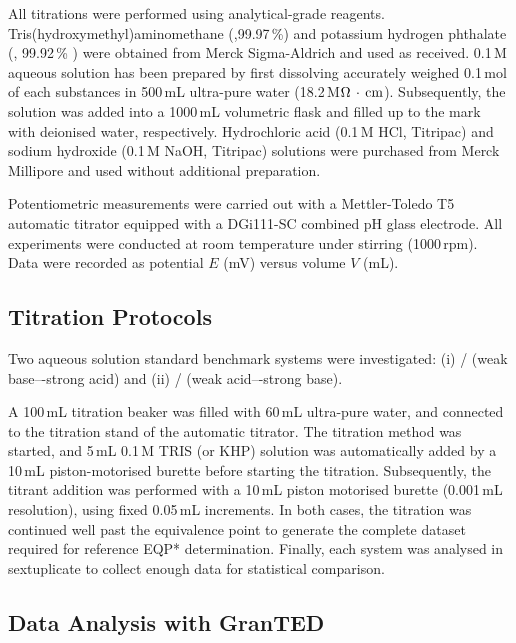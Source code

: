\documentclass[twoside,twocolumn,9pt]{article}
\begin{document}
All titrations were performed using analytical-grade reagents.
Tris(hydroxymethyl)aminomethane (,99.97\,\%) and potassium hydrogen phthalate (, 99.92\,\% ) were obtained from Merck Sigma-Aldrich and used as received.
0.1\,M aqueous solution has been prepared by first dissolving accurately weighed 0.1\,mol of each substances in 500\,mL ultra-pure water (18.2\,M$\Omega\,\cdot\,{\rm cm}$). Subsequently, the solution was added into a 1000\,mL volumetric flask and filled up to the mark with deionised water, respectively. Hydrochloric acid (0.1\,M HCl, Titripac) and sodium hydroxide (0.1\,M NaOH, Titripac) solutions were purchased from Merck Millipore and used without additional preparation. 

Potentiometric measurements were carried out with a Mettler-Toledo T5 automatic titrator equipped with a DGi111-SC combined pH glass electrode.
All experiments were conducted at room temperature under stirring (1000\,rpm). Data were recorded as potential $E$ (mV) versus volume $V$ (mL). %

\subsection*{Titration Protocols}

Two aqueous solution standard benchmark systems were investigated: (i) / (weak base–-strong acid) and (ii) / (weak acid–-strong base).

A 100\,mL titration beaker was filled with 60\,mL ultra-pure water, and connected to the titration stand of the automatic titrator. The titration method was started, and 5\,mL 0.1\,M TRIS (or KHP) solution was automatically added by a 10\,mL piston-motorised burette before starting the titration. Subsequently, the titrant addition was performed with a 10\,mL piston motorised burette (0.001\,mL resolution), using fixed 0.05\,mL increments.
In both cases, the titration was continued well past the equivalence point %
to generate the complete dataset required for reference EQP* determination.%
Finally, each system was analysed in sextuplicate to collect enough data for statistical comparison.

\subsection*{Data Analysis with GranTED}
\end{document}
